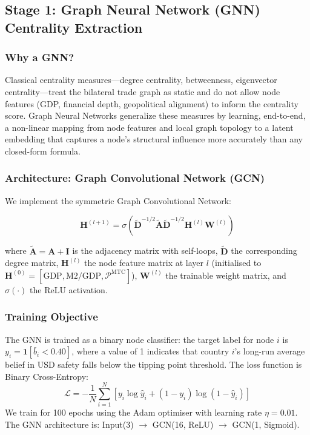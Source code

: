 \documentclass[12pt, letterpaper]{article}
\theoremstyle{definition}
\begin{document}
\subsection{Stage 1: Graph Neural Network (GNN) Centrality Extraction}

\subsubsection{Why a GNN?}

Classical centrality measures---degree centrality, betweenness, eigenvector centrality---treat the bilateral trade graph as static and do not allow node features (GDP, financial depth, geopolitical alignment) to inform the centrality score. Graph Neural Networks generalize these measures by learning, end-to-end, a non-linear mapping from node features and local graph topology to a latent embedding that captures a node's structural influence more accurately than any closed-form formula.

\subsubsection{Architecture: Graph Convolutional Network (GCN)}

We implement the \citet{kipf2017semi} symmetric Graph Convolutional Network:

\begin{equation}
\mathbf{H}^{(l+1)} = \sigma\!\left(\tilde{\mathbf{D}}^{-1/2} \tilde{\mathbf{A}} \tilde{\mathbf{D}}^{-1/2} \mathbf{H}^{(l)} \mathbf{W}^{(l)}\right)
\label{eq:gcn}
\end{equation}

where $\tilde{\mathbf{A}} = \mathbf{A} + \mathbf{I}$ is the adjacency matrix with self-loops, $\tilde{\mathbf{D}}$ the corresponding degree matrix, $\mathbf{H}^{(l)}$ the node feature matrix at layer $l$ (initialised to $\mathbf{H}^{(0)} = [\text{GDP}, \text{M2/GDP}, \mathcal{P}^{\text{MTC}}]$), $\mathbf{W}^{(l)}$ the trainable weight matrix, and $\sigma(\cdot)$ the ReLU activation.

\subsubsection{Training Objective}

The GNN is trained as a binary node classifier: the target label for node $i$ is $y_i = \mathbf{1}[\bar{b}_i < 0.40]$, where a value of 1 indicates that country $i$'s long-run average belief in USD safety falls below the tipping point threshold. The loss function is Binary Cross-Entropy:
\[
\mathcal{L} = -\frac{1}{N} \sum_{i=1}^N \left[ y_i \log \hat{y}_i + (1-y_i) \log(1-\hat{y}_i)\right]
\]
We train for 100 epochs using the Adam optimiser with learning rate $\eta = 0.01$. The GNN architecture is: Input(3) $\to$ GCN(16, ReLU) $\to$ GCN(1, Sigmoid).
\end{document}
